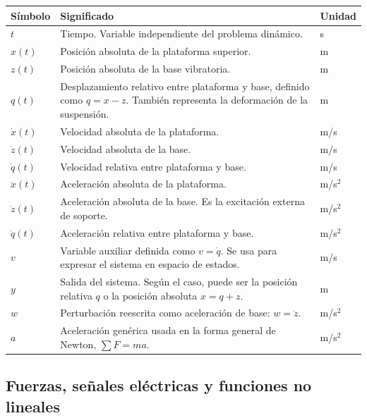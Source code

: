 \documentclass[11pt]{article}
\begin{document}
\renewcommand{\arraystretch}{1.2}
\begin{center}
\small
\begin{tabular}{>{\raggedright\arraybackslash}p{2.8cm} >{\raggedright\arraybackslash}p{9.2cm} >{\raggedright\arraybackslash}p{2.2cm}}
\toprule
\textbf{S\'imbolo} & \textbf{Significado} & \textbf{Unidad} \\
\midrule
$t$ & Tiempo. Variable independiente del problema din\'amico. & s \\
$x(t)$ & Posici\'on absoluta de la plataforma superior. & m \\
$z(t)$ & Posici\'on absoluta de la base vibratoria. & m \\
$q(t)$ & Desplazamiento relativo entre plataforma y base, definido como $q=x-z$. Tambi\'en representa la deformaci\'on de la suspensi\'on. & m \\
$\dot x(t)$ & Velocidad absoluta de la plataforma. & m/s \\
$\dot z(t)$ & Velocidad absoluta de la base. & m/s \\
$\dot q(t)$ & Velocidad relativa entre plataforma y base. & m/s \\
$\ddot x(t)$ & Aceleraci\'on absoluta de la plataforma. & m/s$^2$ \\
$\ddot z(t)$ & Aceleraci\'on absoluta de la base. Es la excitaci\'on externa de soporte. & m/s$^2$ \\
$\ddot q(t)$ & Aceleraci\'on relativa entre plataforma y base. & m/s$^2$ \\
$v$ & Variable auxiliar definida como $v=\dot q$. Se usa para expresar el sistema en espacio de estados. & m/s \\
$y$ & Salida del sistema. Seg\'un el caso, puede ser la posici\'on relativa $q$ o la posici\'on absoluta $x=q+z$. & m \\
$w$ & Perturbaci\'on reescrita como aceleraci\'on de base: $w=\ddot z$. & m/s$^2$ \\
$a$ & Aceleraci\'on gen\'erica usada en la forma general de Newton, $\sum F = ma$. & m/s$^2$ \\
\bottomrule
\end{tabular}
\end{center}

\subsection{Fuerzas, se\~nales el\'ectricas y funciones no lineales}
\end{document}
